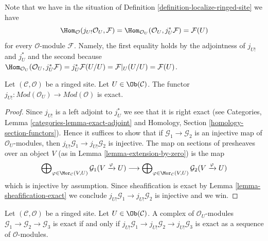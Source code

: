 \noindent
Note that we have in the situation of
Definition \ref{definition-localize-ringed-site} we have
\begin{equation}
\label{equation-map-lower-shriek-OU-into-module}
\Hom_\mathcal{O}(j_{U!}\mathcal{O}_U, \mathcal{F}) =
\Hom_{\mathcal{O}_U}(\mathcal{O}_U, j_U^*\mathcal{F}) =
\mathcal{F}(U)
\end{equation}
for every $\mathcal{O}$-module $\mathcal{F}$. Namely, the first equality
holds by the adjointness of $j_{U!}$ and $j_U^*$ and the second because
$\Hom_{\mathcal{O}_U}(\mathcal{O}_U, j_U^*\mathcal{F}) =
j_U^*\mathcal{F}(U/U) = \mathcal{F}|_U(U/U) = \mathcal{F}(U)$.

\begin{lemma}
\label{lemma-extension-by-zero-exact}
Let $(\mathcal{C}, \mathcal{O})$ be a ringed site.
Let $U \in \Ob(\mathcal{C})$.
The functor
$j_{U!} : \textit{Mod}(\mathcal{O}_U) \to \textit{Mod}(\mathcal{O})$
is exact.
\end{lemma}

\begin{proof}
Since $j_{U!}$ is a left adjoint to $j_U^*$ we see that it is right exact
(see
Categories, Lemma \ref{categories-lemma-exact-adjoint}
and
Homology, Section \ref{homology-section-functors}).
Hence it suffices to show that if $\mathcal{G}_1 \to \mathcal{G}_2$
is an injective map of $\mathcal{O}_U$-modules, then
$j_{U!}\mathcal{G}_1 \to j_{U!}\mathcal{G}_2$ is injective.
The map on sections of presheaves over an object $V$
(as in Lemma \ref{lemma-extension-by-zero}) is the map
$$
\bigoplus\nolimits_{\varphi \in \Mor_\mathcal{C}(V, U)}
\mathcal{G}_1(V \xrightarrow{\varphi} U)
\longrightarrow
\bigoplus\nolimits_{\varphi \in \Mor_\mathcal{C}(V, U)}
\mathcal{G}_2(V \xrightarrow{\varphi} U)
$$
which is injective by assumption. Since sheafification is exact by
Lemma \ref{lemma-sheafification-exact}
we conclude $j_{U!}\mathcal{G}_1 \to j_{U!}\mathcal{G}_2$ is injective and
we win.
\end{proof}

\begin{lemma}
\label{lemma-j-shriek-reflects-exactness}
Let $(\mathcal{C}, \mathcal{O})$ be a ringed site.
Let $U \in \Ob(\mathcal{C})$. A complex of $\mathcal{O}_U$-modules
$\mathcal{G}_1 \to \mathcal{G}_2 \to \mathcal{G}_3$ is exact
if and only if
$j_{U!}\mathcal{G}_1 \to j_{U!}\mathcal{G}_2 \to j_{U!}\mathcal{G}_3$
is exact as a sequence of $\mathcal{O}$-modules.
\end{lemma}

